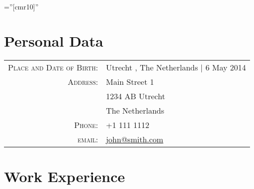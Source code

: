\documentclass[a4paper,10pt]{article} %
\begin{document}
\pagestyle{empty} %

\font\fb=''[cmr10]'' %


\par{\bigskip\par} 

\section{Personal Data}

\begin{tabular}{rl}
\textsc{Place and Date of Birth:} & 
Utrecht %
, 
The Netherlands  %
| 
6 May 2014 %
\\
\textsc{Address:} & 
Main Street 1 %
\\ &
1234 AB %
Utrecht %
\\ &
The Netherlands %
\\
\textsc{Phone:} & 
+1 111 1112 %
\\
\textsc{email:} & \href{mailto:
john@smith.com %
}{
john@smith.com %
}
\end{tabular}


\section{Work Experience}
\end{document}
